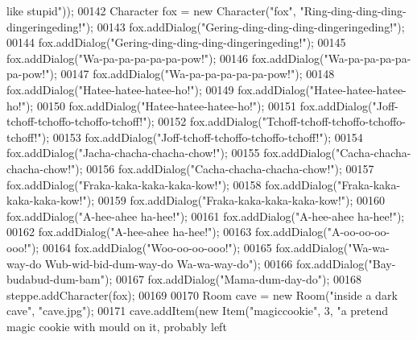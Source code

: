 \begin{DoxyCode}
{       like stupid"}));
00142         Character fox = \textcolor{keyword}{new} Character(\textcolor{stringliteral}{"fox"}, \textcolor{stringliteral}{"Ring-ding-ding-ding-dingeringeding!"});
00143         fox.addDialog(\textcolor{stringliteral}{"Gering-ding-ding-ding-dingeringeding!"});
00144         fox.addDialog(\textcolor{stringliteral}{"Gering-ding-ding-ding-dingeringeding!"});
00145         fox.addDialog(\textcolor{stringliteral}{"Wa-pa-pa-pa-pa-pa-pow!"});
00146         fox.addDialog(\textcolor{stringliteral}{"Wa-pa-pa-pa-pa-pa-pow!"});
00147         fox.addDialog(\textcolor{stringliteral}{"Wa-pa-pa-pa-pa-pa-pow!"});
00148         fox.addDialog(\textcolor{stringliteral}{"Hatee-hatee-hatee-ho!"});
00149         fox.addDialog(\textcolor{stringliteral}{"Hatee-hatee-hatee-ho!"});
00150         fox.addDialog(\textcolor{stringliteral}{"Hatee-hatee-hatee-ho!"});
00151         fox.addDialog(\textcolor{stringliteral}{"Joff-tchoff-tchoffo-tchoffo-tchoff!"});
00152         fox.addDialog(\textcolor{stringliteral}{"Tchoff-tchoff-tchoffo-tchoffo-tchoff!"});
00153         fox.addDialog(\textcolor{stringliteral}{"Joff-tchoff-tchoffo-tchoffo-tchoff!"});
00154         fox.addDialog(\textcolor{stringliteral}{"Jacha-chacha-chacha-chow!"});
00155         fox.addDialog(\textcolor{stringliteral}{"Cacha-chacha-chacha-chow!"});
00156         fox.addDialog(\textcolor{stringliteral}{"Cacha-chacha-chacha-chow!"});
00157         fox.addDialog(\textcolor{stringliteral}{"Fraka-kaka-kaka-kaka-kow!"});
00158         fox.addDialog(\textcolor{stringliteral}{"Fraka-kaka-kaka-kaka-kow!"});
00159         fox.addDialog(\textcolor{stringliteral}{"Fraka-kaka-kaka-kaka-kow!"});
00160         fox.addDialog(\textcolor{stringliteral}{"A-hee-ahee ha-hee!"});
00161         fox.addDialog(\textcolor{stringliteral}{"A-hee-ahee ha-hee!"});
00162         fox.addDialog(\textcolor{stringliteral}{"A-hee-ahee ha-hee!"});
00163         fox.addDialog(\textcolor{stringliteral}{"A-oo-oo-oo-ooo!"});
00164         fox.addDialog(\textcolor{stringliteral}{"Woo-oo-oo-ooo!"});
00165         fox.addDialog(\textcolor{stringliteral}{"Wa-wa-way-do Wub-wid-bid-dum-way-do Wa-wa-way-do"});
00166         fox.addDialog(\textcolor{stringliteral}{"Bay-budabud-dum-bam"});
00167         fox.addDialog(\textcolor{stringliteral}{"Mama-dum-day-do"});
00168         steppe.addCharacter(fox);
00169 
00170         Room cave = \textcolor{keyword}{new} Room(\textcolor{stringliteral}{"inside a dark cave"}, \textcolor{stringliteral}{"cave.jpg"});
00171         cave.addItem(\textcolor{keyword}{new} Item(\textcolor{stringliteral}{"magiccookie"}, 3, \textcolor{stringliteral}{"a pretend magic cookie with mould on it, probably left
}
\end{DoxyCode}
